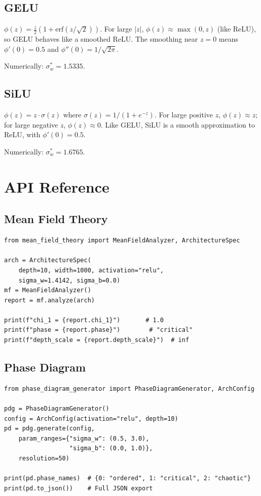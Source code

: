 \documentclass[10pt]{article}
\theoremstyle{definition}
\begin{document}
\subsection{GELU}

$\phi(z) = \frac{z}{2}(1 + \text{erf}(z/\sqrt{2}))$.
For large $|z|$, $\phi(z) \approx \max(0, z)$ (like ReLU), so GELU behaves like a smoothed ReLU.
The smoothing near $z = 0$ means $\phi'(0) = 0.5$ and $\phi''(0) = 1/\sqrt{2\pi}$.

Numerically: $\sigma_w^* = 1.5335$.

\subsection{SiLU}

$\phi(z) = z \cdot \sigma(z)$ where $\sigma(z) = 1/(1 + e^{-z})$.
For large positive $z$, $\phi(z) \approx z$; for large negative $z$, $\phi(z) \approx 0$.
Like GELU, SiLU is a smooth approximation to ReLU, with $\phi'(0) = 0.5$.

Numerically: $\sigma_w^* = 1.6765$.

\section{API Reference}
\label{app:api}

\subsection{Mean Field Theory}

\begin{lstlisting}
from mean_field_theory import MeanFieldAnalyzer, ArchitectureSpec

arch = ArchitectureSpec(
    depth=10, width=1000, activation="relu",
    sigma_w=1.4142, sigma_b=0.0)
mf = MeanFieldAnalyzer()
report = mf.analyze(arch)

print(f"chi_1 = {report.chi_1}")       # 1.0
print(f"phase = {report.phase}")        # "critical"
print(f"depth_scale = {report.depth_scale}")  # inf
\end{lstlisting}

\subsection{Phase Diagram}

\begin{lstlisting}
from phase_diagram_generator import PhaseDiagramGenerator, ArchConfig

pdg = PhaseDiagramGenerator()
config = ArchConfig(activation="relu", depth=10)
pd = pdg.generate(config,
    param_ranges={"sigma_w": (0.5, 3.0),
                  "sigma_b": (0.0, 1.0)},
    resolution=50)

print(pd.phase_names)  # {0: "ordered", 1: "critical", 2: "chaotic"}
print(pd.to_json())    # Full JSON export
\end{lstlisting}
\end{document}
